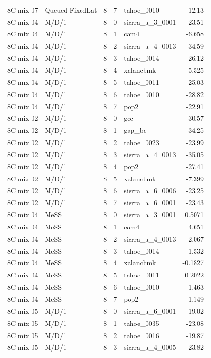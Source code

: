\begin{tabular}{llrrlr}
8C mix 07 & Queued FixedLat & 8 & 7 & tahoe\_0010 & -12.13 \\
8C mix 04 & M/D/1 & 8 & 0 & sierra\_a\_3\_0001 & -23.51 \\
8C mix 04 & M/D/1 & 8 & 1 & cam4 & -6.658 \\
8C mix 04 & M/D/1 & 8 & 2 & sierra\_a\_4\_0013 & -34.59 \\
8C mix 04 & M/D/1 & 8 & 3 & tahoe\_0014 & -26.12 \\
8C mix 04 & M/D/1 & 8 & 4 & xalancbmk & -5.525 \\
8C mix 04 & M/D/1 & 8 & 5 & tahoe\_0011 & -25.03 \\
8C mix 04 & M/D/1 & 8 & 6 & tahoe\_0010 & -28.82 \\
8C mix 04 & M/D/1 & 8 & 7 & pop2 & -22.91 \\
8C mix 02 & M/D/1 & 8 & 0 & gcc & -30.57 \\
8C mix 02 & M/D/1 & 8 & 1 & gap\_bc & -34.25 \\
8C mix 02 & M/D/1 & 8 & 2 & tahoe\_0023 & -23.99 \\
8C mix 02 & M/D/1 & 8 & 3 & sierra\_a\_4\_0013 & -35.05 \\
8C mix 02 & M/D/1 & 8 & 4 & pop2 & -27.41 \\
8C mix 02 & M/D/1 & 8 & 5 & xalancbmk & -7.399 \\
8C mix 02 & M/D/1 & 8 & 6 & sierra\_a\_6\_0006 & -23.25 \\
8C mix 02 & M/D/1 & 8 & 7 & sierra\_a\_6\_0001 & -23.43 \\
8C mix 04 & MeSS & 8 & 0 & sierra\_a\_3\_0001 & 0.5071 \\
8C mix 04 & MeSS & 8 & 1 & cam4 & -4.651 \\
8C mix 04 & MeSS & 8 & 2 & sierra\_a\_4\_0013 & -2.067 \\
8C mix 04 & MeSS & 8 & 3 & tahoe\_0014 & 1.532 \\
8C mix 04 & MeSS & 8 & 4 & xalancbmk & -0.1827 \\
8C mix 04 & MeSS & 8 & 5 & tahoe\_0011 & 0.2022 \\
8C mix 04 & MeSS & 8 & 6 & tahoe\_0010 & -1.463 \\
8C mix 04 & MeSS & 8 & 7 & pop2 & -1.149 \\
8C mix 05 & M/D/1 & 8 & 0 & sierra\_a\_6\_0001 & -19.02 \\
8C mix 05 & M/D/1 & 8 & 1 & tahoe\_0035 & -23.08 \\
8C mix 05 & M/D/1 & 8 & 2 & tahoe\_0016 & -19.87 \\
8C mix 05 & M/D/1 & 8 & 3 & sierra\_a\_4\_0005 & -23.82 \\

\end{tabular}
